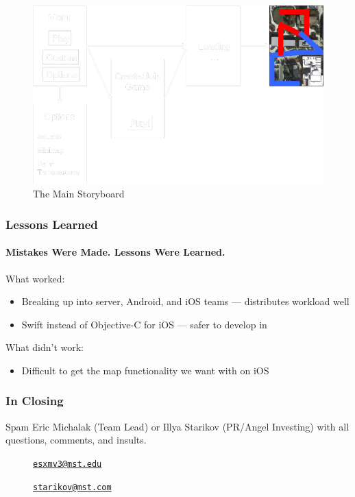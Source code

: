 \documentclass[xclolor=dvipsnames]{beamer}            %
\begin{document}
\begin{darkframes}
\begin{frame}
        \begin{figure}[!ht]
            \centering
            \includegraphics[width=.75\textwidth]{./assets/storyboard.png}
            \caption{The Main Storyboard}
        \end{figure}
    \end{frame}


    \begin{frame}
        \frametitle{Lessons Learned}
        \framesubtitle{Mistakes Were Made. Lessons Were Learned.}

        What worked:

        \begin{itemize}
            \item Breaking up into server, Android, and iOS teams --- distributes workload well
            \item Swift instead of Objective-C for iOS --- safer to develop in
        \end{itemize}

        What didn't work:

        \begin{itemize}
            \item Difficult to get the map functionality we want with  on iOS
        \end{itemize}

    \end{frame}


    \begin{frame}
        \frametitle{In Closing}

        Spam Eric Michalak (Team Lead) or Illya Starikov (PR/Angel Investing) with all questions, comments, and insults.

        \begin{center}
            \begin{description}
                \item[\faComment] \href{mailto:esxmv3@mst.edu}{\nolinkurl{esxmv3@mst.edu}}
                \item[\faComment] \href{mailto:starikov@mst.edu}{\nolinkurl{starikov@mst.com}}
            \end{description}
        \end{center}


\end{frame}
\end{darkframes}
\end{document}
